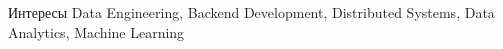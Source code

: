 

\begin{rubric}{Интересы}
    \entry*[]
        Data Engineering, Backend Development, Distributed Systems, Data Analytics, Machine Learning
\end{rubric}

